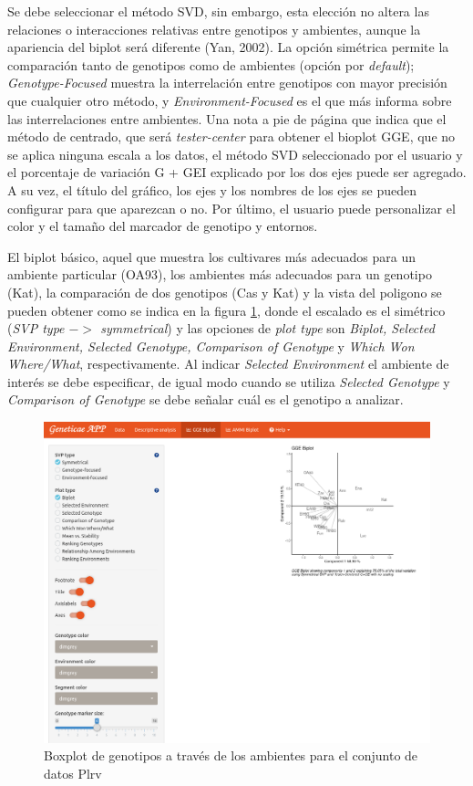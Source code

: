 Se debe seleccionar el método SVD, sin embargo, esta elección no altera las relaciones o interacciones relativas entre genotipos y ambientes, aunque la apariencia del biplot será diferente (Yan, 2002). La opción simétrica permite la comparación tanto de genotipos como de ambientes (opción por \emph{default}); \emph{Genotype-Focused} muestra la interrelación entre genotipos con mayor precisión que cualquier otro método, y \emph{Environment-Focused} es el que más informa sobre las interrelaciones entre ambientes. Una nota a pie de página que indica que el método de centrado, que será \emph{tester-center} para obtener el bioplot GGE, que no se aplica ninguna escala a los datos, el método SVD seleccionado por el usuario y el porcentaje de variación G + GEI explicado por los dos ejes puede ser agregado. A su vez, el título del gráfico, los ejes y los nombres de los ejes se pueden configurar para que aparezcan o no. Por último, el usuario puede personalizar el color y el tamaño del marcador de genotipo y entornos. 

El biplot básico, aquel que muestra los cultivares más adecuados para un ambiente particular (OA93), los ambientes más adecuados para un genotipo (Kat), la comparación de dos genotipos (Cas y Kat) y la vista del poligono se pueden obtener como se indica en la figura \ref{fig:fig4312}, donde el escalado es el simétrico (\emph{SVP type $->$ symmetrical}) y las opciones de \emph{plot type} son \emph{Biplot,
Selected Environment, Selected Genotype, Comparison of Genotype} y \emph{Which Won Where/What}, respectivamente. Al indicar \emph{Selected Environment} el ambiente de interés se debe especificar, de igual modo cuando se utiliza \emph{Selected Genotype} y 
\emph{Comparison of Genotype} se debe señalar cuál es el genotipo a analizar.

\begin{figure}[H]
	\begin{center}
		\includegraphics[width=16cm]{./Graficos/www/biplot_GGE.png}
	\end{center}
	\caption{Boxplot de genotipos a través de los ambientes para el conjunto de datos Plrv}
	\label{fig:fig4312}
\end{figure}

